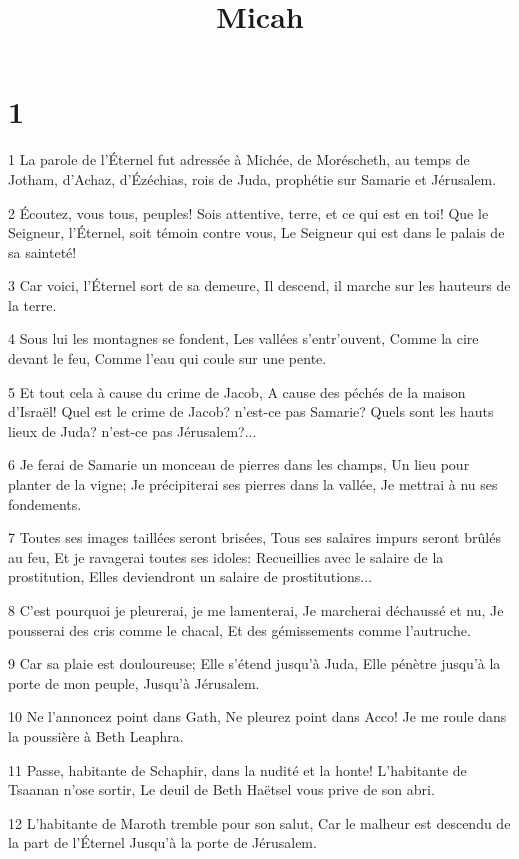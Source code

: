 

\title{Micah}


\chapter{1}

\par 1 La parole de l'Éternel fut adressée à Michée, de Moréscheth, au temps de Jotham, d'Achaz, d'Ézéchias, rois de Juda, prophétie sur Samarie et Jérusalem.
\par 2 Écoutez, vous tous, peuples! Sois attentive, terre, et ce qui est en toi! Que le Seigneur, l'Éternel, soit témoin contre vous, Le Seigneur qui est dans le palais de sa sainteté!
\par 3 Car voici, l'Éternel sort de sa demeure, Il descend, il marche sur les hauteurs de la terre.
\par 4 Sous lui les montagnes se fondent, Les vallées s'entr'ouvent, Comme la cire devant le feu, Comme l'eau qui coule sur une pente.
\par 5 Et tout cela à cause du crime de Jacob, A cause des péchés de la maison d'Israël! Quel est le crime de Jacob? n'est-ce pas Samarie? Quels sont les hauts lieux de Juda? n'est-ce pas Jérusalem?...
\par 6 Je ferai de Samarie un monceau de pierres dans les champs, Un lieu pour planter de la vigne; Je précipiterai ses pierres dans la vallée, Je mettrai à nu ses fondements.
\par 7 Toutes ses images taillées seront brisées, Tous ses salaires impurs seront brûlés au feu, Et je ravagerai toutes ses idoles: Recueillies avec le salaire de la prostitution, Elles deviendront un salaire de prostitutions...
\par 8 C'est pourquoi je pleurerai, je me lamenterai, Je marcherai déchaussé et nu, Je pousserai des cris comme le chacal, Et des gémissements comme l'autruche.
\par 9 Car sa plaie est douloureuse; Elle s'étend jusqu'à Juda, Elle pénètre jusqu'à la porte de mon peuple, Jusqu'à Jérusalem.
\par 10 Ne l'annoncez point dans Gath, Ne pleurez point dans Acco! Je me roule dans la poussière à Beth Leaphra.
\par 11 Passe, habitante de Schaphir, dans la nudité et la honte! L'habitante de Tsaanan n'ose sortir, Le deuil de Beth Haëtsel vous prive de son abri.
\par 12 L'habitante de Maroth tremble pour son salut, Car le malheur est descendu de la part de l'Éternel Jusqu'à la porte de Jérusalem.
